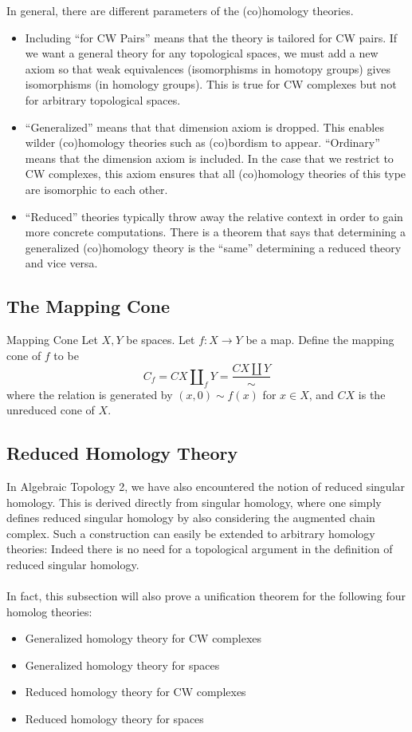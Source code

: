 \documentclass[a4paper]{article}
\begin{document}
In general, there are different parameters of the (co)homology theories. 
\begin{itemize}
\item Including ``for CW Pairs'' means that the theory is tailored for CW pairs. If we want a general theory for any topological spaces, we must add a new axiom so that weak equivalences (isomorphisms in homotopy groups) gives isomorphisms (in homology groups). This is true for CW complexes but not for arbitrary topological spaces. 
\item ``Generalized'' means that that dimension axiom is dropped. This enables wilder (co)homology theories such as (co)bordism to appear. ``Ordinary'' means that the dimension axiom is included. In the case that we restrict to CW complexes, this axiom ensures that all (co)homology theories of this type are isomorphic to each other. 
\item ``Reduced'' theories typically throw away the relative context in order to gain more concrete computations. There is a theorem that says that determining a generalized (co)homology theory is the ``same'' determining a reduced theory and vice versa. 
\end{itemize}

\subsection{The Mapping Cone}
\begin{defn}{Mapping Cone}{} Let $X,Y$ be spaces. Let $f:X\to Y$ be a map. Define the mapping cone of $f$ to be $$C_f=CX\amalg_fY=\frac{CX\amalg Y}{\sim}$$ where the relation is generated by $(x,0)\sim f(x)$ for $x\in X$, and $CX$ is the unreduced cone of $X$. 
\end{defn}

\subsection{Reduced Homology Theory}
In Algebraic Topology 2, we have also encountered the notion of reduced singular homology. This is derived directly from singular homology, where one simply defines reduced singular homology by also considering the augmented chain complex. Such a construction can easily be extended to arbitrary homology theories: Indeed there is no need for a topological argument in the definition of reduced singular homology. \\~\\

In fact, this subsection will also prove a unification theorem for the following four homolog theories: 
\begin{itemize}
\item Generalized homology theory for CW complexes
\item Generalized homology theory for spaces
\item Reduced homology theory for CW complexes
\item Reduced homology theory for spaces
\end{itemize}
\end{document}
